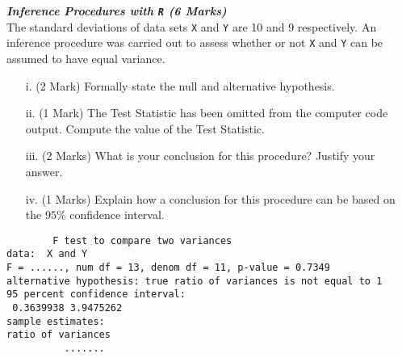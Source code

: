 
\item[(d)] \textbf{\textit{Inference Procedures with \texttt{R} (6 Marks)}}\\
The standard deviations of data sets \texttt{X} and \texttt{Y} are 10 and 9 respectively. 
An inference procedure was carried out to assess whether or not \texttt{X} and \texttt{Y} can be assumed to have equal variance.
\begin{itemize}
\item[i.](2 Mark) Formally state the null and alternative hypothesis.
\item[ii.](1 Mark) The Test Statistic has been omitted from the computer code output. Compute the value of the Test Statistic.
\item[iii.](2 Marks) What is your conclusion for this procedure? Justify your answer.
\item[iv.] (1 Marks) Explain how a conclusion for this procedure can be based on the $95\%$ confidence interval.
\end{itemize}

\begin{framed}
\begin{verbatim}
        F test to compare two variances
data:  X and Y
F = ......, num df = 13, denom df = 11, p-value = 0.7349
alternative hypothesis: true ratio of variances is not equal to 1
95 percent confidence interval:
 0.3639938 3.9475262
sample estimates:
ratio of variances
          .......
\end{verbatim}
\end{framed}
